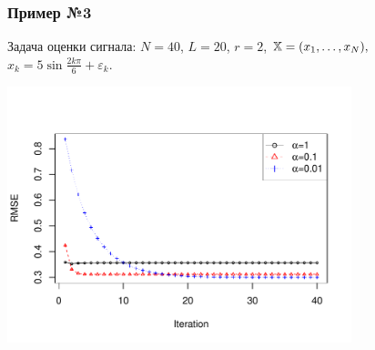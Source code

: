 \documentclass[unicode, notheorems]{beamer}
\begin{document}
\begin{frame}
	\frametitle{Пример №3}
	Задача оценки сигнала: $N = 40$, $L = 20$, $r = 2$, $\mathbb{X} = (x_{1}, \ldots, x_N),$  $x_k = 5\sin{\frac{2 k \pi}{6}} + \varepsilon_k$.
	
	\vspace{-1cm}
	\begin{center}
		\includegraphics*[width = 10cm]{cadzowspeed_3.pdf}
	\end{center}
\end{frame}

	

	
\end{document}

